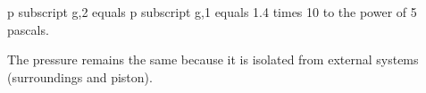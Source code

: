 p subscript g,2 equals p subscript g,1 equals 1.4 times 10 to the power of 5 pascals.  

The pressure remains the same because it is isolated from external systems (surroundings and piston).